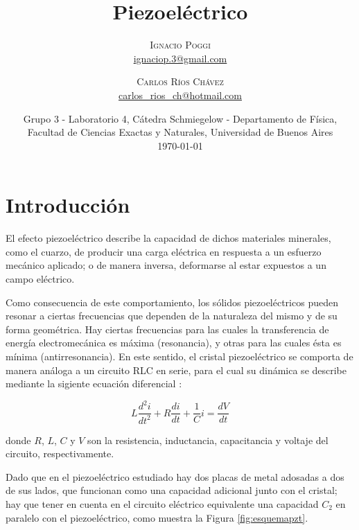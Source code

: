 \documentclass[twoside,twocolumn,a4paper]{article}
\title{Piezoel\'ectrico} %
\author{%
\textsc{Ignacio Poggi} \\[1ex] %
\normalsize \href{mailto:ignaciop.3@gmail.com}{ignaciop.3@gmail.com} %
\and %
\textsc{Carlos R\'ios Ch\'avez} \\[1ex] %
\normalsize \href{mailto:carlos_rios_ch@hotmail.com}{carlos\_rios\_ch@hotmail.com} %
}
\date{Grupo 3 - Laboratorio 4, C\'atedra Schmiegelow - Departamento de F\'isica, Facultad de Ciencias Exactas y Naturales, Universidad de Buenos Aires \newline \\ \today} %
\begin{document}
\maketitle



\section{Introducci\'on}



El efecto piezoel\'ectrico describe la capacidad de dichos materiales minerales, como el cuarzo, de producir una carga el\'ectrica en respuesta a un esfuerzo mec\'anico aplicado; o de manera inversa, deformarse al estar expuestos a un campo el\'ectrico. \newline

\par
Como consecuencia de este comportamiento, los s\'olidos piezoel\'ectricos pueden resonar a ciertas frecuencias que dependen de la naturaleza del mismo y de su forma geom\'etrica. Hay ciertas frecuencias para las cuales la transferencia de energ\'ia electromec\'anica es m\'axima (resonancia), y otras para las cuales \'esta es m\'inima (antirresonancia). En este sentido, el cristal piezoel\'ectrico se comporta de manera an\'aloga a un circuito RLC en serie, para el cual su din\'amica se describe mediante la sigiente ecuaci\'on diferencial \cite{eq:oderlc}:

\begin{equation}
\label{eq:oderlc}
L\frac{d^{2}i}{dt^{2}} + R\frac{di}{dt} + \frac{1}{C}i = \frac{dV}{dt}
\end{equation}

donde $R$, $L$, $C$ y $V$ son la resistencia, inductancia, capacitancia y voltaje del circuito, respectivamente. \newline


\par
Dado que en el piezoel\'ectrico estudiado hay dos placas de metal adosadas a dos de sus lados, que funcionan como una capacidad adicional junto con el cristal; hay que tener en cuenta en el circuito el\'ectrico equivalente una capacidad $C_{2}$ en paralelo con el piezoel\'ectrico, como muestra la Figura \ref{fig:esquemapzt}.
\end{document}
